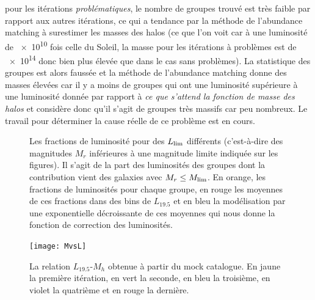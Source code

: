 pour les itérations \emph{problématiques}, le nombre de groupes trouvé est très faible par rapport aux autres itérations, ce qui a
tendance par la méthode de l'abundance matching à surestimer les masses des halos (ce que l'on voit car à une luminosité de
\num{e10} fois celle du Soleil, la masse pour les itérations à problèmes est de \num{e14} donc bien plus élevée que dans le cas
sans problèmes). La statistique des groupes est alors faussée et la méthode de l'abundance matching donne des masses élevées car il
y a moins de groupes qui ont une luminosité supérieure à une luminosité donnée par rapport à \emph{ce que s'attend la fonction de
masse des halos} et considère donc qu'il s'agit de groupes très massifs car peu nombreux. Le travail pour déterminer la cause
réelle de ce problème est en cours.
\begin{figure}[htb]
	\centering
	\caption{\footnotesize{}Les fractions de luminosité pour des $L_{\rm{lim}}$ différents (c'est-à-dire des magnitudes $M_r$
	inférieures à une magnitude limite indiquée sur les figures). Il s'agit de la part des luminosités des groupes dont la
	contribution vient des galaxies avec $M_r\leq{M_{\rm{lim}}}$. En orange, les fractions de luminosités pour chaque groupe,
	en rouge les moyennes de ces fractions dans des bins de $L_{19.5}$ et en bleu la modélisation par une exponentielle
	décroissante de ces moyennes qui nous donne la fonction de correction des luminosités.}
	\label{fig:frac1}
\end{figure}
\begin{figure}[ht]
	\centering
	\texttt{[image: MvsL]}
	\caption{\footnotesize{}La relation $L_{19.5}$-$M_h$ obtenue à partir du mock catalogue. En jaune la première itération,
	en vert la seconde, en bleu la troisième, en violet la quatrième et en rouge la dernière.}
	\label{fig:mvslmock}
\end{figure}

